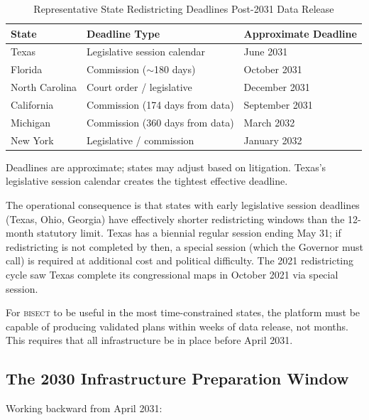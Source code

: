\begin{table}[ht]
\centering
\caption{Representative State Redistricting Deadlines Post-2031 Data Release}
\label{tab:deadlines}
\begin{tabular}{lll}
\toprule
State & Deadline Type & Approximate Deadline \\
\midrule
Texas & Legislative session calendar & June 2031 \\
Florida & Commission ($\sim$180 days) & October 2031 \\
North Carolina & Court order / legislative & December 2031 \\
California & Commission (174 days from data) & September 2031 \\
Michigan & Commission (360 days from data) & March 2032 \\
New York & Legislative / commission & January 2032 \\
\bottomrule
\end{tabular}
\begin{tablenotes}
\small
\item Deadlines are approximate; states may adjust based on litigation.
  Texas's legislative session calendar creates the tightest effective deadline.
\end{tablenotes}
\end{table}

The operational consequence is that states with early legislative session deadlines
(Texas, Ohio, Georgia) have effectively shorter redistricting windows than the
12-month statutory limit. Texas has a biennial regular session ending May 31; if
redistricting is not completed by then, a special session (which the Governor must
call) is required at additional cost and political difficulty. The 2021 redistricting
cycle saw Texas complete its congressional maps in October 2021 via special session.

For \textsc{bisect} to be useful in the most time-constrained states, the platform
must be capable of producing validated plans within weeks of data release, not months.
This requires that all infrastructure be in place before April 2031.

\subsection{The 2030 Infrastructure Preparation Window}

Working backward from April 2031:


